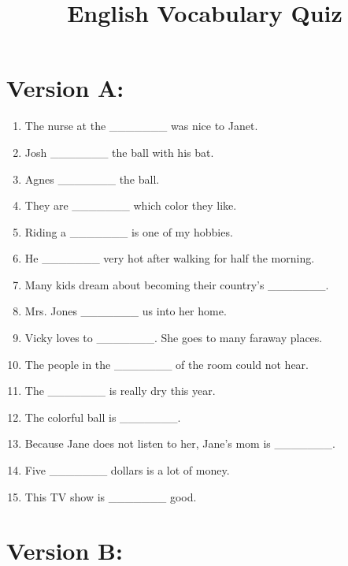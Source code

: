 \documentclass[a4paper,12pt]{article}
\title{English Vocabulary Quiz}
\date{}
\begin{document}
\maketitle

\section*{Version A:}

\begin{enumerate}[label=\arabic*.]
    \item The nurse at the \_\_\_\_\_\_\_ was nice to Janet.
    \item Josh \_\_\_\_\_\_\_ the ball with his bat.
    \item Agnes \_\_\_\_\_\_\_ the ball.
    \item They are \_\_\_\_\_\_\_ which color they like.
    \item Riding a \_\_\_\_\_\_\_ is one of my hobbies.
    \item He \_\_\_\_\_\_\_ very hot after walking for half the morning.
    \item Many kids dream about becoming their country's \_\_\_\_\_\_\_.
    \item Mrs. Jones \_\_\_\_\_\_\_ us into her home.
    \item Vicky loves to \_\_\_\_\_\_\_. She goes to many faraway places.
    \item The people in the \_\_\_\_\_\_\_ of the room could not hear.
    \item The \_\_\_\_\_\_\_ is really dry this year.
    \item The colorful ball is \_\_\_\_\_\_\_.
    \item Because Jane does not listen to her, Jane's mom is \_\_\_\_\_\_\_.
    \item Five \_\_\_\_\_\_\_ dollars is a lot of money.
    \item This TV show is \_\_\_\_\_\_\_ good.
\end{enumerate}

\newpage

\section*{Version B:}
\end{document}
